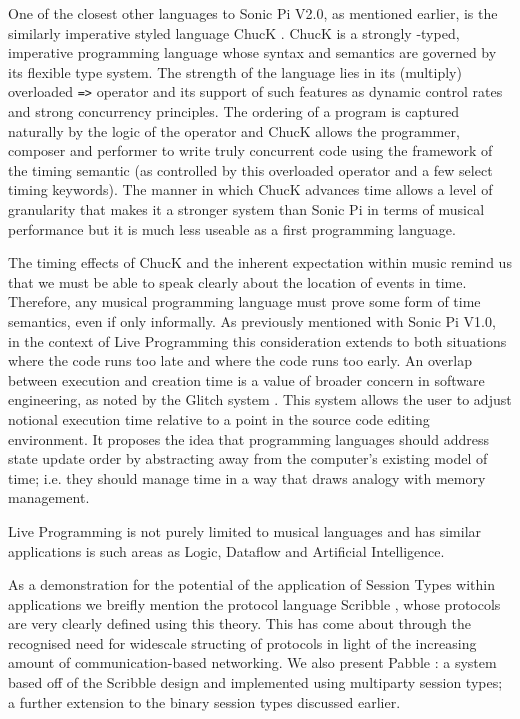 \documentclass[11pt]{scrartcl}
\begin{document}
One of the closest other languages to Sonic Pi V2.0, as mentioned earlier, is 
the similarly imperative styled language ChucK \cite{WC03}. ChucK is a strongly
-typed, imperative programming language whose syntax and semantics are 
governed by its flexible type system. The strength of the language lies in its 
(multiply) overloaded \texttt{=>} operator and its support of such features as 
dynamic control rates and strong concurrency principles. The ordering of a 
program is captured naturally by the logic of the operator and ChucK allows 
the programmer, composer and performer to write truly concurrent code using 
the framework of the timing semantic (as controlled by this overloaded 
operator and a few select timing keywords). The manner in which ChucK advances 
time allows a level of granularity that makes it a stronger system than Sonic 
Pi in terms of musical performance but it is much less useable as a first 
programming language.

The timing effects of ChucK and the inherent expectation within music remind 
us that we must be able to speak clearly about the location of events in time. 
Therefore, any musical programming language must prove some form of time 
semantics, even if only informally. As previously mentioned with Sonic Pi 
V1.0, in the context of Live Programming this consideration extends to both 
situations where the code runs too late and where the code runs too early. An 
overlap between execution and creation time is a value of broader concern in 
software engineering, as noted by the Glitch system \cite{ME14}. This system 
allows the user to adjust notional execution time relative to a point in the 
source code editing environment. It proposes the idea that programming 
languages should address state update order by abstracting away from the 
computer's existing model of time; i.e. they should manage time in a way that 
draws analogy with memory management. 

Live Programming is not purely limited to musical languages and has similar 
applications is such areas as Logic, Dataflow and Artificial Intelligence.

As a demonstration for the potential of the application of Session Types 
within applications we breifly mention the protocol language Scribble 
\cite{HMBCY11}, whose protocols are very clearly defined using this theory. 
This has come about through the recognised need for widescale structing of 
protocols in light of the increasing amount of communication-based networking. 
We also present Pabble \cite{NY14}: a system based off of the Scribble design 
and implemented using multiparty session types; a further extension to the 
binary session types discussed earlier.
\newpage
\end{document}
